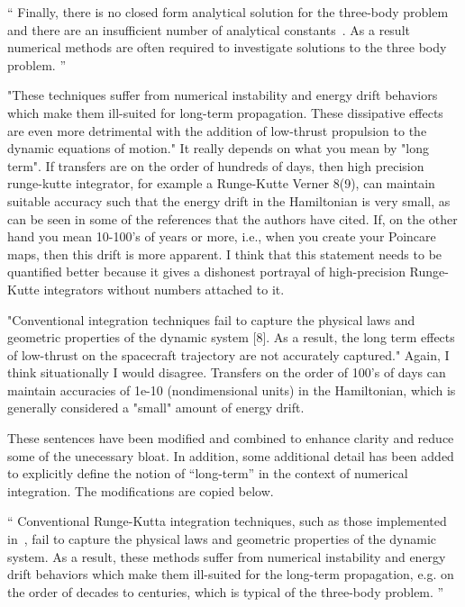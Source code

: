 \documentclass[11pt]{article}
\newenvironment{correction}{\begin{list}{}{\setlength{\leftmargin}{1cm}\setlength{\rightmargin}{1cm}}\vspace{\parsep}\item[]``}{''\end{list}}
\begin{document}
\begin{enumerate}
\begin{correction}
Finally, there is no closed form analytical solution for the three-body problem and there are an insufficient number of analytical constants~\cite{szebehely1967}.
As a result numerical methods are often required to investigate solutions to the three body problem.
\end{correction}

\item 
    \begin{itshape}
"These techniques suffer from numerical instability and energy drift behaviors which make them ill-suited for long-term propagation. These dissipative effects are even more detrimental with the addition of low-thrust propulsion to the dynamic equations of motion."  It really depends on what you mean by "long term".  If transfers are on the order of hundreds of days, then high precision runge-kutte integrator, for example a Runge-Kutte Verner 8(9), can maintain suitable accuracy such that the energy drift in the Hamiltonian is very small, as can be seen in some of the references that the authors have cited.  If, on the other hand you mean 10-100's of years or more, i.e., when you create your Poincare maps, then this drift is more apparent.  I think that this statement needs to be quantified better because it gives a dishonest portrayal of high-precision Runge-Kutte integrators without numbers attached to it.

"Conventional integration techniques fail to capture the physical laws and geometric properties of the dynamic system [8]. As a result, the long term effects of low-thrust on the spacecraft trajectory are not accurately captured."  Again, I think situationally I would disagree.  Transfers on the order of 100's of days can maintain accuracies of 1e-10 (nondimensional units) in the Hamiltonian, which is generally considered a "small" amount of energy drift.
\end{itshape}

These sentences have been modified and combined to enhance clarity and reduce some of the unecessary bloat. 
In addition, some additional detail has been added to explicitly define the notion of ``long-term'' in the context of numerical integration.
The modifications are copied below.
\begin{correction}
    Conventional Runge-Kutta integration techniques, such as those implemented in~\cite{mingotti2011,grebow2011}, fail to capture the physical laws and geometric properties of the dynamic system.
    As a result, these methods suffer from numerical instability and energy drift behaviors which make them ill-suited for the long-term propagation, e.g. on the order of decades to centuries, which is typical of the three-body problem. 
\end{correction}


\end{enumerate}
\end{document}
